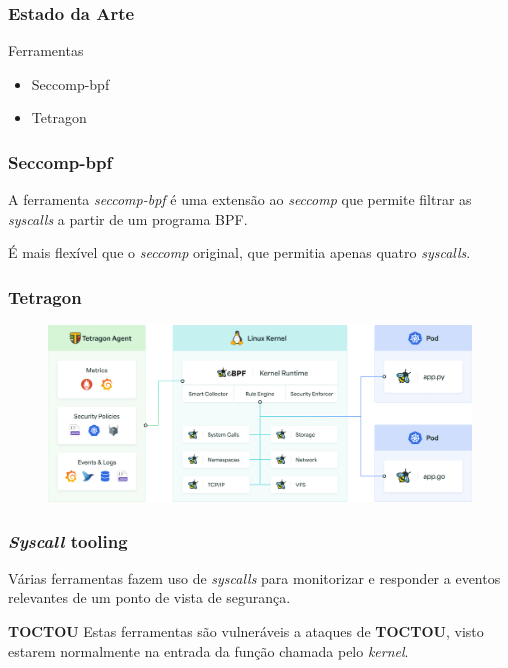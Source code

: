\documentclass[pdflatex,compress]{beamer}
\begin{document}
\begin{frame}
\frametitle{Estado da Arte}

\begin{exampleblock}{Ferramentas}
    \begin{itemize}
        \pause
        \item Seccomp-bpf
        \pause
        \item Tetragon
    \end{itemize}
\end{exampleblock}

\end{frame}


\begin{frame}
\frametitle{Seccomp-bpf}

A ferramenta \emph{seccomp-bpf} é uma extensão ao \emph{seccomp} que permite filtrar as \emph{syscalls} a partir de um programa BPF.

É mais flexível que o \emph{seccomp} original, que permitia apenas quatro \emph{syscalls}.  


\end{frame}


\begin{frame}
\frametitle{Tetragon}


\begin{figure}[x]
\includegraphics[scale=0.15]{tetragon.png}
\centering
\end{figure}

\end{frame}

\begin{frame}
\frametitle{\emph{Syscall} tooling}

Várias ferramentas fazem uso de \emph{syscalls} para monitorizar e responder a eventos relevantes de um ponto de vista de segurança. 

\pause
\begin{alertblock}{\textbf{TOCTOU}}
    Estas ferramentas são vulneráveis a ataques de \textbf{TOCTOU}, visto estarem normalmente na entrada da função chamada pelo \emph{kernel}.
\end{alertblock}


\end{frame}
\end{document}
